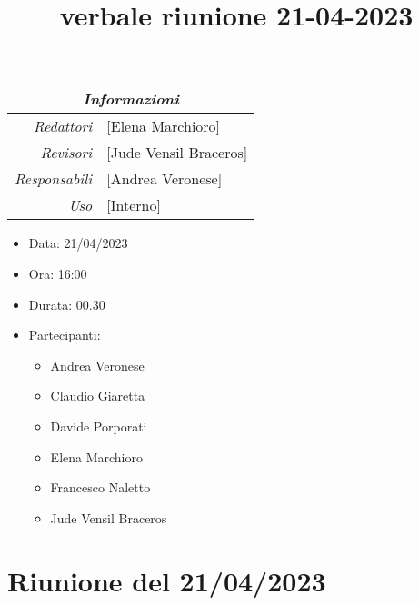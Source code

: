\documentclass[12pt]{article}
\begin{document}
\graphicspath{ {../../templates/img} }

\title{verbale riunione 21-04-2023}

\firstPage
\maketitle

\begin{center}
\begin{tabular}{r | l}
    \multicolumn{2}{c}{\textit{Informazioni}}\\
    \hline
    
        \textit{Redattori} &
        [Elena Marchioro]\makecell{}\\
    
        \textit{Revisori} &
        [Jude Vensil Braceros]\makecell{}\\
        \textit{Responsabili} &
        [Andrea Veronese]\makecell{}\\
            \textit{Uso} & 
            [Interno]\makecell{}\\
\end{tabular}
    \begin{itemize}
    \item[] Data: 21/04/2023
    \item[] Ora: 16:00
    \item[] Durata: 00.30
    \item[] Partecipanti:
    \begin{itemize}
    \item[] Andrea Veronese
    \item[] Claudio Giaretta
    \item[] Davide Porporati
    \item[] Elena Marchioro
    \item[] Francesco Naletto
    \item[] Jude Vensil Braceros
    \end{itemize}
    \end{itemize}
\end{center}


\tableofcontents
\printindex 
\section{Riunione del 21/04/2023}
\end{document}
